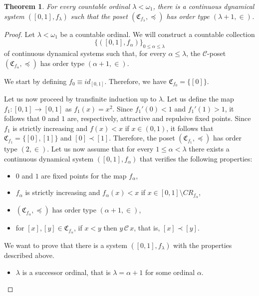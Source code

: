 \documentclass[pdflatex,sn-mathphys-num]{sn-jnl}
\theoremstyle{thmstyleone}%
\newtheorem{thm}{Theorem}
\theoremstyle{thmstyletwo}%
\theoremstyle{thmstylethree}%
\begin{document}
\begin{thm}\label{ordinal_order_type} 
For every countable ordinal $ \lambda<\omega_1$, there is a continuous dynamical system $([0,1],f_\lambda)$ such that the poset $(\mathfrak{C}_{f_\lambda},\preceq)$ has order type $(\lambda+1, \in)$.
\end{thm}
\begin{proof}
Let $\lambda<\omega_1$ be a countable ordinal. 
We will construct a countable collection 
    \[
    \Big \{([0,1],f_\alpha)\Big \}_{0\le\alpha\le\lambda}
    \]
    of continuous dynamical systems such that, for every $\alpha\le\lambda$, the $\mathcal{C}$-poset $(\mathfrak{C}_{f_\alpha},\preceq)$ has order type $(\alpha+1, \in)$.
    
    \noindent We start by defining $f_0\equiv id_{[0,1]}$. Therefore, we have $\mathfrak{C}_{f_0}=\{[0]\}$. 
    
    \noindent Let us now proceed by transfinite induction up to $\lambda$. Let us define the map $f_1:[0,1]\rightarrow [0,1]$ as $f_1(x)=x^2$.
    Since $f_1'(0)<1$ and $f_1'(1)>1$, it follows that $0$ and $1$ are, respectively, attractive and repulsive fixed points. Since $f_1$ is strictly increasing and $f(x)<x$ if $x\in (0,1)$, it follows that $\mathfrak{C}_{f_1}=\{[0],[1]\}$ and $[0]\prec [1]$. Therefore, the poset $(\mathfrak{C}_{f_1},\preceq)$ has order type $(2,\in)$. 
    Let us now assume that for every $1\le \alpha<\lambda$ there exists a continuous dynamical system $([0,1],f_\alpha)$ that verifies the following properties: 
 \begin{itemize}
     \item[(i)] $0$ and $1$ are fixed points for the map $f_\alpha$,
     \item[(ii)] $f_\alpha$ is strictly increasing and $f_\alpha(x)<x$ if $x\in [0,1]\setminus CR_{f_\alpha}$,
     \item[(iii)] $(\mathfrak{C}_{f_\alpha},\preceq)$ has order type $(\alpha+1,\in)$,
     \item[(iv)] for $[x],[y]\in \mathfrak{C}_{f_\alpha}$, if $x<y$ then $y\,\mathcal{C}\, x$, that is, $[x]\prec [y]$.
 \end{itemize}
\noindent We want to prove that there is a system $([0,1],f_\lambda)$ with the properties described above.
\begin{itemize}
    \item[Case 1.] $\lambda$ is a successor ordinal, that is $\lambda=\alpha+1$ for some ordinal $\alpha$.


\end{itemize}
\end{proof}
\end{document}
